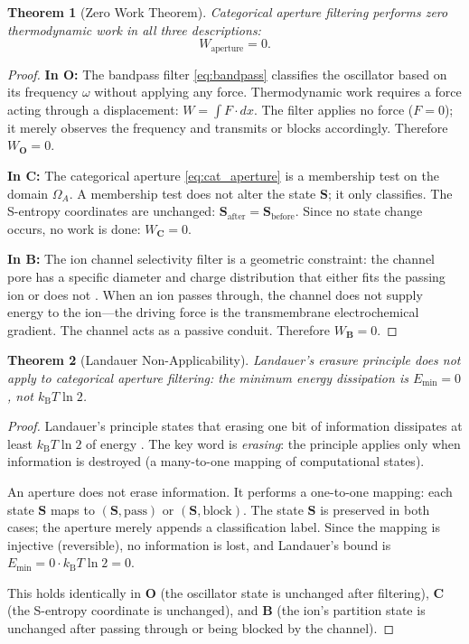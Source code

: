 \documentclass[twocolumn,10pt]{article}
\newtheorem{theorem}{Theorem}[section]
\theoremstyle{remark}
\newcommand{\kB}{k_{\mathrm{B}}}
\newcommand{\Scoord}{\mathbf{S}}
\newcommand{\CatO}{\mathbf{O}}
\newcommand{\CatC}{\mathbf{C}}
\newcommand{\CatB}{\mathbf{B}}
\begin{document}
\begin{theorem}[Zero Work Theorem]
\label{thm:zero_work}
Categorical aperture filtering performs zero thermodynamic work in all three descriptions:
\begin{equation}
W_{\mathrm{aperture}} = 0.
\label{eq:zero_work}
\end{equation}
\end{theorem}

\begin{proof}
\textbf{In $\CatO$:}
The bandpass filter \eqref{eq:bandpass} classifies the oscillator based on its frequency $\omega$ without applying any force.
Thermodynamic work requires a force acting through a displacement: $W = \int F \cdot dx$.
The filter applies no force ($F = 0$); it merely observes the frequency and transmits or blocks accordingly.
Therefore $W_\CatO = 0$.

\textbf{In $\CatC$:}
The categorical aperture \eqref{eq:cat_aperture} is a membership test on the domain $\Omega_A$.
A membership test does not alter the state $\Scoord$; it only classifies.
The S-entropy coordinates are unchanged: $\Scoord_{\mathrm{after}} = \Scoord_{\mathrm{before}}$.
Since no state change occurs, no work is done: $W_\CatC = 0$.

\textbf{In $\CatB$:}
The ion channel selectivity filter is a geometric constraint: the channel pore has a specific diameter and charge distribution that either fits the passing ion or does not \cite{hodgkin1952}.
When an ion passes through, the channel does not supply energy to the ion---the driving force is the transmembrane electrochemical gradient.
The channel acts as a passive conduit.
Therefore $W_\CatB = 0$.
\end{proof}

\begin{theorem}[Landauer Non-Applicability]
\label{thm:landauer_nonapply}
Landauer's erasure principle \cite{landauer1961} does not apply to categorical aperture filtering: the minimum energy dissipation is $E_{\min} = 0$, not $\kB T \ln 2$.
\end{theorem}

\begin{proof}
Landauer's principle states that erasing one bit of information dissipates at least $\kB T \ln 2$ of energy \cite{landauer1961,bennett1982}.
The key word is \emph{erasing}: the principle applies only when information is destroyed (a many-to-one mapping of computational states).

An aperture does not erase information.
It performs a one-to-one mapping: each state $\Scoord$ maps to $(\Scoord, \mathrm{pass})$ or $(\Scoord, \mathrm{block})$.
The state $\Scoord$ is preserved in both cases; the aperture merely appends a classification label.
Since the mapping is injective (reversible), no information is lost, and Landauer's bound is $E_{\min} = 0 \cdot \kB T \ln 2 = 0$.

This holds identically in $\CatO$ (the oscillator state is unchanged after filtering), $\CatC$ (the S-entropy coordinate is unchanged), and $\CatB$ (the ion's partition state is unchanged after passing through or being blocked by the channel).
\end{proof}
\end{document}
